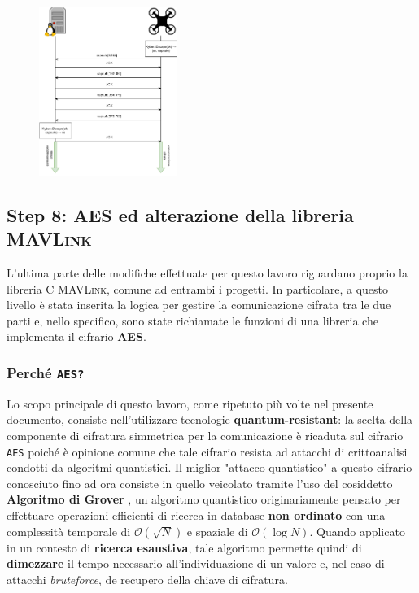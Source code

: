 \documentclass[a4paper, 12pt, oneside]{article}
\theoremstyle{definition}
\begin{document}
\begin{figure}[H]
    \centering
    \includegraphics[width=0.4\textwidth]{images/capsule.pdf}
\end{figure}

\newpage
\subsection{Step 8: AES ed alterazione della libreria \textsc{MAVLink}}
L'ultima parte delle modifiche effettuate per questo lavoro riguardano proprio la libreria C \textsc{MAVLink}, comune ad entrambi i progetti. In particolare, a questo livello è stata inserita la logica per gestire la comunicazione cifrata tra le due parti e, nello specifico, sono state richiamate le funzioni di una libreria che implementa il cifrario \textbf{AES}.

\subsubsection{Perché \texttt{AES?}}
Lo scopo principale di questo lavoro, come ripetuto più volte nel presente documento, consiste nell'utilizzare tecnologie \textbf{quantum-resistant}: la scelta della componente di cifratura simmetrica per la comunicazione è ricaduta sul cifrario \texttt{AES} poiché è opinione comune che tale cifrario resista ad attacchi di crittoanalisi condotti da algoritmi quantistici. Il miglior "attacco quantistico" a questo cifrario conosciuto fino ad ora consiste in quello veicolato tramite l'uso del cosiddetto \textbf{Algoritmo di Grover} \cite{grover1996fast}, un algoritmo quantistico originariamente pensato per effettuare operazioni efficienti di ricerca in database \textbf{non ordinato} con una complessità temporale di $\mathcal{O}(\sqrt{N})$ e spaziale di $\mathcal{O}(\log N)$. Quando applicato in un contesto di \textbf{ricerca esaustiva}, tale algoritmo permette quindi di \textbf{dimezzare} il tempo necessario all'individuazione di un valore e, nel caso di attacchi \textit{bruteforce}, de recupero della chiave di cifratura.\cite*{cryptoeprint:2017/811}
\end{document}
